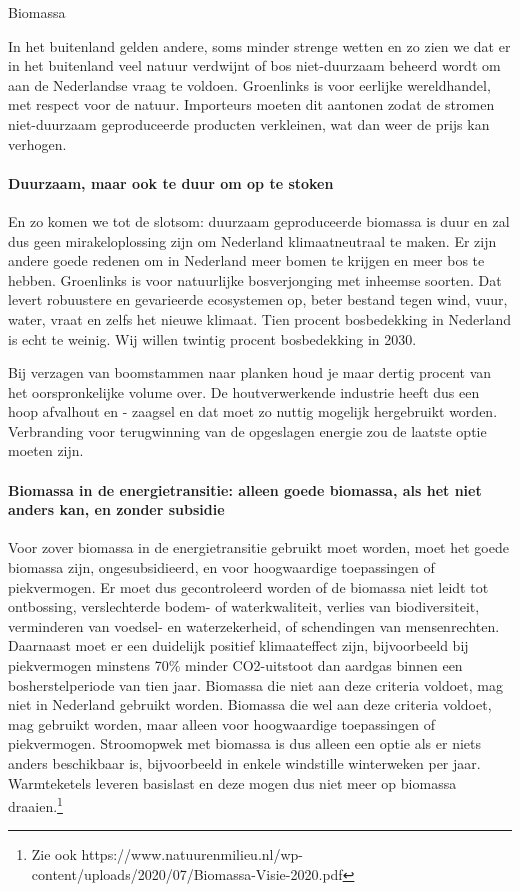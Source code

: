 \begin{voorstel}{Biomassa}
\begin{multicols*}{2}
\begin{overwegingen}
In het buitenland gelden andere, soms minder strenge wetten en zo zien we dat er in het buitenland veel natuur verdwijnt of bos niet-duurzaam beheerd wordt om aan de Nederlandse vraag te voldoen. Groenlinks is voor eerlijke wereldhandel, met respect voor de natuur. Importeurs  moeten dit aantonen zodat de stromen niet-duurzaam geproduceerde producten verkleinen, wat dan weer de prijs kan verhogen.

\paragraph{Duurzaam, maar ook te duur om op te stoken}
En zo komen we tot de slotsom: duurzaam geproduceerde biomassa is duur en zal dus geen mirakeloplossing zijn om Nederland klimaatneutraal te maken. Er zijn andere goede redenen om in Nederland meer bomen te krijgen en meer bos te hebben. Groenlinks is voor natuurlijke bosverjonging met inheemse soorten. Dat levert robuustere en gevarieerde ecosystemen op, beter bestand tegen wind, vuur, water, vraat en zelfs het nieuwe klimaat. Tien procent bosbedekking in Nederland is echt te weinig. Wij willen twintig procent bosbedekking in 2030.

Bij verzagen van boomstammen naar planken houd je maar dertig procent van het oorspronkelijke volume over. De houtverwerkende industrie heeft dus een hoop afvalhout en - zaagsel en dat moet zo nuttig mogelijk hergebruikt worden. Verbranding voor terugwinning van de opgeslagen energie zou de laatste optie moeten zijn.

\paragraph{Biomassa in de energietransitie: alleen goede biomassa, als het niet anders kan, en zonder subsidie}
Voor zover biomassa in de energietransitie gebruikt moet worden, moet het goede biomassa zijn, ongesubsidieerd, en voor hoogwaardige toepassingen of piekvermogen. Er moet dus gecontroleerd worden of de biomassa niet leidt tot ontbossing, verslechterde bodem- of waterkwaliteit, verlies van biodiversiteit, verminderen van voedsel- en waterzekerheid, of schendingen van mensenrechten. Daarnaast moet er een duidelijk positief klimaateffect zijn, bijvoorbeeld bij piekvermogen minstens 70\% minder CO2-uitstoot dan aardgas binnen een bosherstelperiode van tien jaar. Biomassa die niet aan deze criteria voldoet, mag niet in Nederland gebruikt worden. Biomassa die wel aan deze criteria voldoet, mag gebruikt worden, maar alleen voor hoogwaardige toepassingen of piekvermogen. Stroomopwek met biomassa is dus alleen een optie als er niets anders beschikbaar is, bijvoorbeeld in enkele windstille winterweken per jaar. Warmteketels leveren basislast en deze mogen dus niet meer op biomassa draaien.\footnote{Zie ook https://www.natuurenmilieu.nl/wp-content/uploads/2020/07/Biomassa-Visie-2020.pdf}


\end{overwegingen}
\end{multicols*}
\end{voorstel}
